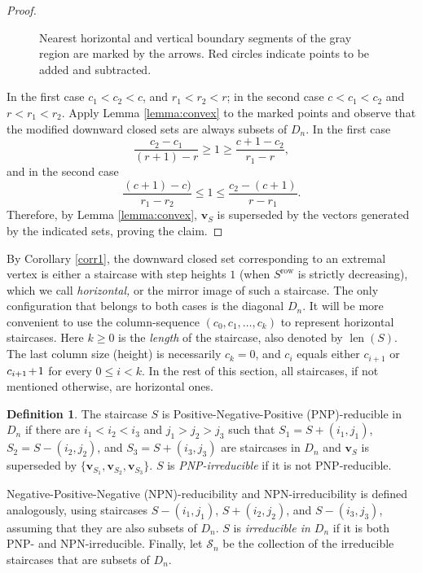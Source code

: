 \documentclass[reqno]{amsart}
\theoremstyle{definition}
\newtheorem{definition}{Definition}
\newcommand\tsp{\mkern 1.5mu}
\renewcommand\ge{\geqslant}\renewcommand\le{\leqslant}
\DeclareMathOperator\len{\mathrm{len}}
\def\m#1{\tsp{#1}\tsp}
\begin{document}
\begin{proof}
\begin{figure}[h!tb]
\caption{Nearest horizontal and vertical boundary segments of the gray
region are marked by the arrows. Red circles indicate points to be added and
subtracted.
}\label{fig:corr1}
\end{figure}
In the first case $c_1<c_2<c$, and $r_1<r_2<r$; in the second case
$c<c_1<c_2$ and $r<r_1<r_2$. Apply Lemma \ref{lemma:convex} to the marked
points and observe that the modified downward closed sets are always subsets
of $D_n$. In the first case
$$
   \frac{c_2-c_1}{(r+1)-r} \ge 1 \ge \frac{c+1-c_2}{r_1-r},
$$
and in the second case
$$
   \frac{(c+1)-c)}{r_1-r_2} \le 1 \le \frac{c_2-(c+1)}{r-r_1}.
$$
Therefore, by Lemma \ref{lemma:convex}, $\mathbf v_S$ is superseded by the
vectors generated by the indicated sets, proving the claim.
\end{proof}

By Corollary \ref{corr1}, the downward closed set corresponding to an
extremal vertex is either a staircase with step heights $1$ (when
$S^{\mathrm{row}}$ is strictly decreasing), which we call \emph{horizontal,}
or the mirror image of such a staircase. The only configuration that belongs
to both cases is the diagonal $D_n$. It will be more convenient to use the
column-sequence $(c_0,c_1,\dots,c_k)$ to represent horizontal staircases.
Here $k\ge 0$ is the \emph{length} of the staircase, also denoted by
$\len(S)$. The last column size (height) is necessarily $c_k=0$, and $c_i$
equals either $c_{i+1}$ or $c_{i+1}\m+1$ for every $0\le i<k$. In the rest
of this section, all staircases, if not mentioned otherwise, are horizontal
ones.

\begin{definition}\label{def:PNP}
The staircase $S$ is Positive-Negative-Positive (PNP)-reducible in $D_n$ if
there are $i_1<i_2<i_3$ and $j_1>j_2>j_3$ such that $S_1=S+(i_1,j_1)$,
$S_2=S-(i_2,j_2)$, and $S_3=S+(i_3,j_3)$ are staircases in $D_n$ and
$\mathbf v_S$ is superseded by $\{\mathbf v_{S_1},\mathbf v_{S_2},\mathbf
v_{S_3}\}$. $S$ is \emph{PNP-irreducible} if it is not PNP-reducible.

Negative-Positive-Negative (NPN)-reducibility and NPN-irreducibility is
defined analogously, using staircases $S-(i_1,j_1)$, $S+(i_2,j_2)$, and
$S-(i_3,j_3)$, assuming that they are also subsets of $D_n$. $S$ is
\emph{irreducible in $D_n$} if it is both PNP- and NPN-irreducible. Finally,
let $\mathcal S_n$ be the collection of the irreducible staircases that are
subsets of $D_n$.
\end{definition}
\end{document}
